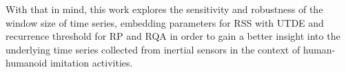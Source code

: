 \documentclass[fleqn,10pt]{wlscirep}
\begin{document}
With that in mind, this work explores the sensitivity and robustness of the window size of time series, embedding parameters for RSS with UTDE and recurrence threshold for RP and RQA in order to gain a better insight into the underlying time series collected from inertial sensors in the context of human-humanoid imitation activities.


\end{document}
